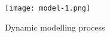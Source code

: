 % 

%




 




\begin{figure}[H]
	\centering
	\texttt{[image: model-1.png]}
	\caption{Dynamic modelling process}
	\label{F01-101}
\end{figure}
